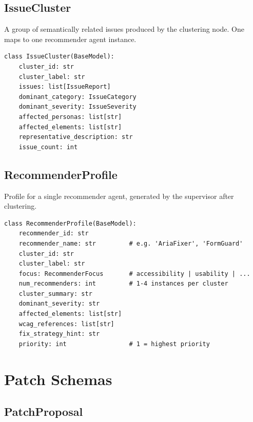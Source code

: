 \subsection{IssueCluster}

A group of semantically related issues produced by the clustering node. One  maps to one recommender agent instance.

\begin{lstlisting}[caption={IssueCluster Pydantic model (from \filepath{schemas/issue\_schema.py}).}, label={lst:issuecluster}]
class IssueCluster(BaseModel):
    cluster_id: str
    cluster_label: str
    issues: list[IssueReport]
    dominant_category: IssueCategory
    dominant_severity: IssueSeverity
    affected_personas: list[str]
    affected_elements: list[str]
    representative_description: str
    issue_count: int
\end{lstlisting}

\subsection{RecommenderProfile}

Profile for a single recommender agent, generated by the supervisor after clustering.

\begin{lstlisting}[caption={RecommenderProfile Pydantic model (from \filepath{schemas/issue\_schema.py}).}, label={lst:recommenderprofile}]
class RecommenderProfile(BaseModel):
    recommender_id: str
    recommender_name: str         # e.g. 'AriaFixer', 'FormGuard'
    cluster_id: str
    cluster_label: str
    focus: RecommenderFocus       # accessibility | usability | ...
    num_recommenders: int         # 1-4 instances per cluster
    cluster_summary: str
    dominant_severity: str
    affected_elements: list[str]
    wcag_references: list[str]
    fix_strategy_hint: str
    priority: int                 # 1 = highest priority
\end{lstlisting}


\section{Patch Schemas}
\label{app:patch-schemas}

\subsection{PatchProposal}

